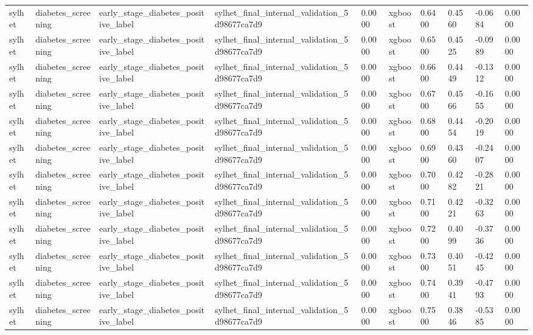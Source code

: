 \begin{tabular}{llllllllll}
sylhet & diabetes\_screening & early\_stage\_diabetes\_positive\_label & sylhet\_final\_internal\_validation\_5d98677ca7d9 & 0.0000 & xgboost & 0.6400 & 0.4560 & -0.0684 & 0.0000 \\
sylhet & diabetes\_screening & early\_stage\_diabetes\_positive\_label & sylhet\_final\_internal\_validation\_5d98677ca7d9 & 0.0000 & xgboost & 0.6500 & 0.4525 & -0.0989 & 0.0000 \\
sylhet & diabetes\_screening & early\_stage\_diabetes\_positive\_label & sylhet\_final\_internal\_validation\_5d98677ca7d9 & 0.0000 & xgboost & 0.6600 & 0.4449 & -0.1312 & 0.0000 \\
sylhet & diabetes\_screening & early\_stage\_diabetes\_positive\_label & sylhet\_final\_internal\_validation\_5d98677ca7d9 & 0.0000 & xgboost & 0.6700 & 0.4566 & -0.1655 & 0.0000 \\
sylhet & diabetes\_screening & early\_stage\_diabetes\_positive\_label & sylhet\_final\_internal\_validation\_5d98677ca7d9 & 0.0000 & xgboost & 0.6800 & 0.4454 & -0.2019 & 0.0000 \\
sylhet & diabetes\_screening & early\_stage\_diabetes\_positive\_label & sylhet\_final\_internal\_validation\_5d98677ca7d9 & 0.0000 & xgboost & 0.6900 & 0.4360 & -0.2407 & 0.0000 \\
sylhet & diabetes\_screening & early\_stage\_diabetes\_positive\_label & sylhet\_final\_internal\_validation\_5d98677ca7d9 & 0.0000 & xgboost & 0.7000 & 0.4282 & -0.2821 & 0.0000 \\
sylhet & diabetes\_screening & early\_stage\_diabetes\_positive\_label & sylhet\_final\_internal\_validation\_5d98677ca7d9 & 0.0000 & xgboost & 0.7100 & 0.4221 & -0.3263 & 0.0000 \\
sylhet & diabetes\_screening & early\_stage\_diabetes\_positive\_label & sylhet\_final\_internal\_validation\_5d98677ca7d9 & 0.0000 & xgboost & 0.7200 & 0.4099 & -0.3736 & 0.0000 \\
sylhet & diabetes\_screening & early\_stage\_diabetes\_positive\_label & sylhet\_final\_internal\_validation\_5d98677ca7d9 & 0.0000 & xgboost & 0.7300 & 0.4051 & -0.4245 & 0.0000 \\
sylhet & diabetes\_screening & early\_stage\_diabetes\_positive\_label & sylhet\_final\_internal\_validation\_5d98677ca7d9 & 0.0000 & xgboost & 0.7400 & 0.3941 & -0.4793 & 0.0000 \\
sylhet & diabetes\_screening & early\_stage\_diabetes\_positive\_label & sylhet\_final\_internal\_validation\_5d98677ca7d9 & 0.0000 & xgboost & 0.7500 & 0.3846 & -0.5385 & 0.0000 \\

\end{tabular}
